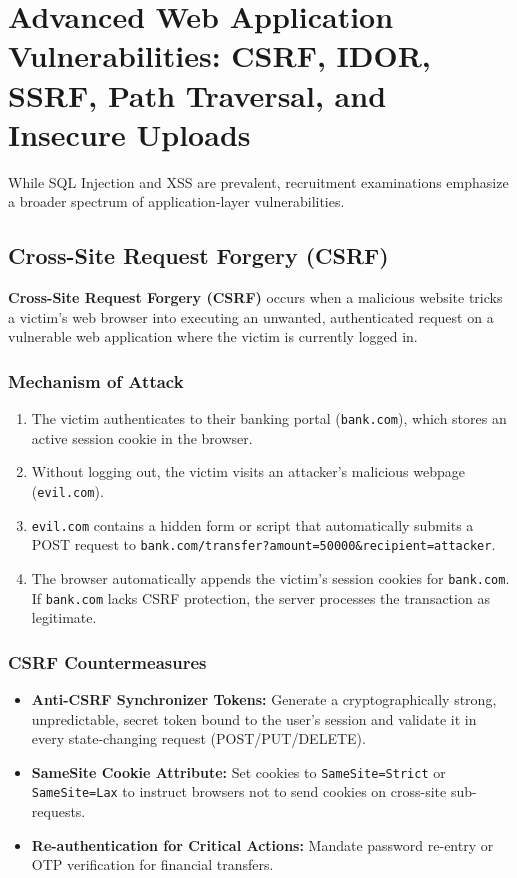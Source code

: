 \newpage
\section{Advanced Web Application Vulnerabilities: CSRF, IDOR, SSRF, Path Traversal, and Insecure Uploads}

While SQL Injection and XSS are prevalent, recruitment examinations emphasize a broader spectrum of application-layer vulnerabilities.

\subsection{Cross-Site Request Forgery (CSRF)}

\textbf{Cross-Site Request Forgery (CSRF)} occurs when a malicious website tricks a victim's web browser into executing an unwanted, authenticated request on a vulnerable web application where the victim is currently logged in.

\subsubsection{Mechanism of Attack}

\begin{enumerate}
\item The victim authenticates to their banking portal (\texttt{bank.com}), which stores an active session cookie in the browser.
\item Without logging out, the victim visits an attacker's malicious webpage (\texttt{evil.com}).
\item \texttt{evil.com} contains a hidden form or script that automatically submits a POST request to \texttt{bank.com/transfer?amount=50000\&recipient=attacker}.
\item The browser automatically appends the victim's session cookies for \texttt{bank.com}. If \texttt{bank.com} lacks CSRF protection, the server processes the transaction as legitimate.
\end{enumerate}

\subsubsection{CSRF Countermeasures}

\begin{itemize}
\item \textbf{Anti-CSRF Synchronizer Tokens:} Generate a cryptographically strong, unpredictable, secret token bound to the user's session and validate it in every state-changing request (POST/PUT/DELETE).
\item \textbf{SameSite Cookie Attribute:} Set cookies to \texttt{SameSite=Strict} or \texttt{SameSite=Lax} to instruct browsers not to send cookies on cross-site sub-requests.
\item \textbf{Re-authentication for Critical Actions:} Mandate password re-entry or OTP verification for financial transfers.
\end{itemize}

